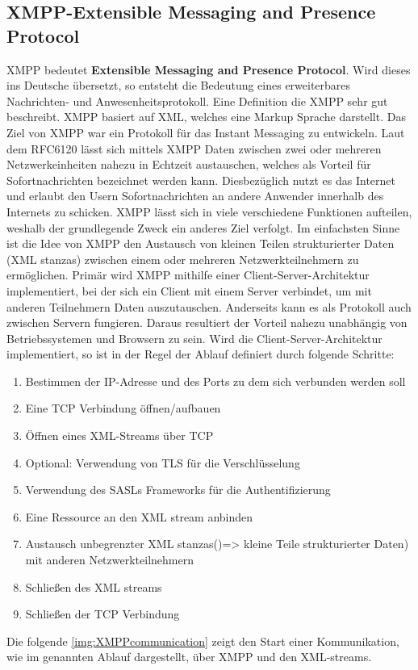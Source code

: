 \documentclass[a4paper,titlepage,halfparskip,12pt]{scrreprt}
\begin{document}
\begin{onehalfspacing}
\section{XMPP-Extensible Messaging and Presence Protocol}
\label{sec:XMPP}
\ac{XMPP} bedeutet \textbf{Extensible Messaging and Presence Protocol}. Wird dieses ins Deutsche übersetzt, so entsteht die Bedeutung eines erweiterbares Nachrichten- und Anwesenheitsprotokoll. Eine Definition die \ac{XMPP} sehr gut beschreibt. \ac{XMPP} basiert auf \ac{XML}, welches eine Markup Sprache darstellt. Das Ziel von \ac{XMPP} war ein Protokoll für das Instant Messaging zu entwickeln. Laut dem RFC6120 lässt sich mittels \ac{XMPP} Daten zwischen zwei oder mehreren Netzwerkeinheiten nahezu in Echtzeit austauschen, welches als Vorteil für Sofortnachrichten bezeichnet werden kann. Diesbezüglich nutzt es das Internet und erlaubt den Usern Sofortnachrichten an andere Anwender innerhalb des Internets zu schicken. \ac{XMPP} lässt sich in viele verschiedene Funktionen aufteilen, weshalb der grundlegende Zweck ein anderes Ziel verfolgt. Im einfachsten Sinne ist die Idee von \ac{XMPP} den Austausch von kleinen Teilen strukturierter Daten (\glqq \ac{XML} stanzas\grqq) zwischen einem oder mehreren Netzwerkteilnehmern zu ermöglichen. Primär wird \ac{XMPP} mithilfe einer Client-Server-Architektur implementiert, bei der sich ein Client mit einem Server verbindet, um mit anderen Teilnehmern Daten auszutauschen. Anderseits kann es als Protokoll auch zwischen Servern fungieren. Daraus resultiert der Vorteil nahezu unabhängig von Betriebssystemen und Browsern zu sein. Wird die Client-Server-Architektur implementiert, so ist in der Regel der Ablauf definiert durch folgende Schritte: \cite{RFC6120} 
\begin{enumerate}
	\item Bestimmen der IP-Adresse und des Ports zu dem sich verbunden werden soll 
	\item Eine \ac{TCP} Verbindung öffnen/aufbauen
	\item Öffnen eines \ac{XML}-Streams über \ac{TCP}
	\item Optional: Verwendung von \ac{TLS} für die Verschlüsselung
	\item Verwendung des SASLs Frameworks für die Authentifizierung
	\item Eine Ressource an den \ac{XML} stream anbinden
	\item Austausch unbegrenzter \glqq \ac{XML} stanzas\grqq ()=> kleine Teile strukturierter Daten) mit anderen Netzwerkteilnehmern
	\item Schließen des \ac{XML} streams
	\item Schließen der \ac{TCP} Verbindung
\end{enumerate}
Die folgende \autoref{img:XMPPcommunication} zeigt den Start einer Kommunikation, wie im genannten Ablauf dargestellt, über \ac{XMPP} und den \ac{XML}-streams.


\end{onehalfspacing}
\end{document}
